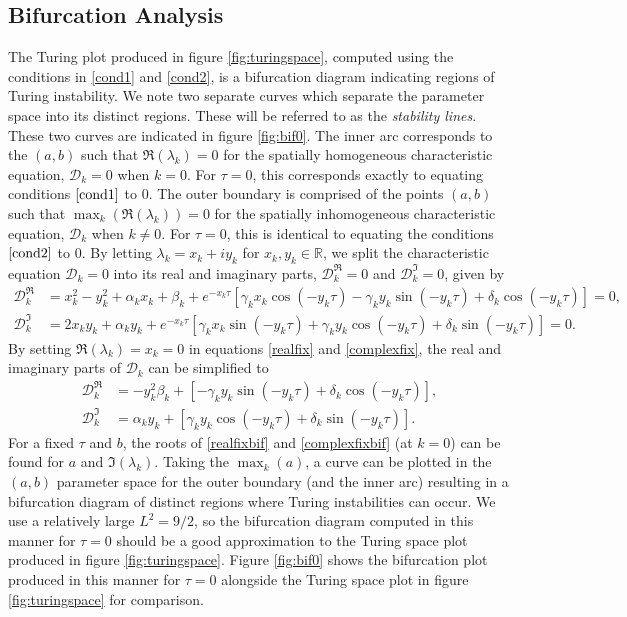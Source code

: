 \subsection{Bifurcation Analysis}\label{section:fixedbif}
The Turing plot produced in figure \ref{fig:turingspace}, computed using the conditions in \eqref{cond1} and \eqref{cond2}, is a bifurcation diagram indicating regions of Turing instability. We note two separate curves which separate the parameter space into its distinct regions. These will be referred to as the \textit{stability lines}.
These two curves are indicated in figure \ref{fig:bif0}. The inner arc corresponds to the $(a,b)$ such that $\Re(\lambda_k)=0$ for the
spatially homogeneous characteristic equation, $\mathcal{D}_k=0$ when $k=0$. For $\tau=0$, this corresponds exactly to equating conditions $\eqref{cond1}$ to 0. The outer boundary is comprised of the points $(a,b)$ such that $\max_k(\Re(\lambda_k))=0$ for the spatially inhomogeneous characteristic equation, $\mathcal{D}_k$ when $k\neq0$. For $\tau=0$, this is identical to equating the conditions $\eqref{cond2}$ to 0. By letting $\lambda_k=x_k+iy_k$ for $x_k,y_k\in\mathbb{R}$, we split the characteristic equation $\mathcal{D}_k=0$ into its real and imaginary parts, $\mathcal{D}_k^{\Re}=0$ and $\mathcal{D}_k^{\Im}=0$, given by
\begin{align}\label{realfix}
\mathcal{D}_k^{\Re}&=x_k^2-y_k^2+\alpha_kx_k+\beta_k+e^{-x_k\tau}[\gamma_kx_k\cos(-y_k\tau)-\gamma_ky_k\sin(-y_k\tau)+\delta_k\cos(-y_k\tau)]=0,\\
\mathcal{D}_k^{\Im}&=2x_ky_k+\alpha_ky_k+e^{-x_k\tau}[\gamma_kx_k\sin(-y_k\tau)+\gamma_ky_k\cos(-y_k\tau)+\delta_k\sin(-y_k\tau)]=0.\label{complexfix}
\end{align}
By setting $\Re(\lambda_k)=x_k=0$ in equations \eqref{realfix} and \eqref{complexfix}, the real and imaginary parts of $\mathcal{D}_k$ can be simplified to
\begin{align}\label{realfixbif}
  \mathcal{D}_k^{\Re}&=-y_k^2\beta_k+[-\gamma_ky_k\sin(-y_k\tau)+\delta_k\cos(-y_k\tau)],\\
  \mathcal{D}_k^{\Im}&=\alpha_ky_k+[\gamma_ky_k\cos(-y_k\tau)+\delta_k\sin(-y_k\tau)].\label{complexfixbif}
\end{align}
For a fixed $\tau$ and $b$, the roots of \eqref{realfixbif} and \eqref{complexfixbif} (at $k=0$) can be found for $a$ and $\Im(\lambda_k)$.
Taking the $\max_k(a)$, a curve can be plotted in the $(a,b)$ parameter space for the outer boundary (and the inner arc) resulting in a bifurcation diagram of distinct regions where Turing instabilities can occur. We use a relatively large $L^2=9/2$, so the bifurcation diagram computed in this manner for $\tau=0$ should be a good approximation to the Turing space plot produced in figure \ref{fig:turingspace}. Figure \ref{fig:bif0} shows the bifurcation plot produced in this manner for $\tau=0$ alongside the Turing space plot in figure \ref{fig:turingspace} for comparison.

